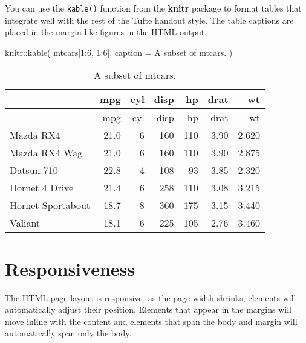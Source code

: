 \documentclass[
  letterpaper,
  DIV=11,
  numbers=noendperiod,
  oneside]{scrartcl}
\newenvironment{Shaded}{\begin{snugshade}}{\end{snugshade}}
\newcommand{\AttributeTok}[1]{\textcolor[rgb]{0.40,0.45,0.13}{#1}}
\newcommand{\DecValTok}[1]{\textcolor[rgb]{0.68,0.00,0.00}{#1}}
\newcommand{\FunctionTok}[1]{\textcolor[rgb]{0.28,0.35,0.67}{#1}}
\newcommand{\NormalTok}[1]{\textcolor[rgb]{0.00,0.23,0.31}{#1}}
\newcommand{\SpecialCharTok}[1]{\textcolor[rgb]{0.37,0.37,0.37}{#1}}
\newcommand{\StringTok}[1]{\textcolor[rgb]{0.13,0.47,0.30}{#1}}
\begin{document}
You can use the \texttt{kable()} function from the \textbf{knitr}
package to format tables that integrate well with the rest of the Tufte
handout style. The table captions are placed in the margin like figures
in the HTML output.

\begin{Shaded}
\begin{Highlighting}[]
\NormalTok{knitr}\SpecialCharTok{::}\FunctionTok{kable}\NormalTok{(}
\NormalTok{  mtcars[}\DecValTok{1}\SpecialCharTok{:}\DecValTok{6}\NormalTok{, }\DecValTok{1}\SpecialCharTok{:}\DecValTok{6}\NormalTok{], }\AttributeTok{caption =} \StringTok{\textquotesingle{}A subset of mtcars.\textquotesingle{}}
\NormalTok{)}
\end{Highlighting}
\end{Shaded}

{
\makeatletter
\def\LT@makecaption#1#2#3{%
  \noalign{\smash{\hbox{\kern\textwidth\rlap{\kern\marginparsep
  \parbox[t]{\marginparwidth}{%
    \footnotesize{%
      \vspace{(1.1\baselineskip)}
    #1{#2: }\ignorespaces #3}}}}}}%
    }
\makeatother

\begin{longtable}[]{@{}lrrrrrr@{}}
\caption{A subset of mtcars.}\tabularnewline
\toprule\noalign{}
& mpg & cyl & disp & hp & drat & wt \\
\midrule\noalign{}
\endfirsthead
\toprule\noalign{}
& mpg & cyl & disp & hp & drat & wt \\
\midrule\noalign{}
\endhead
\bottomrule\noalign{}
\endlastfoot
Mazda RX4 & 21.0 & 6 & 160 & 110 & 3.90 & 2.620 \\
Mazda RX4 Wag & 21.0 & 6 & 160 & 110 & 3.90 & 2.875 \\
Datsun 710 & 22.8 & 4 & 108 & 93 & 3.85 & 2.320 \\
Hornet 4 Drive & 21.4 & 6 & 258 & 110 & 3.08 & 3.215 \\
Hornet Sportabout & 18.7 & 8 & 360 & 175 & 3.15 & 3.440 \\
Valiant & 18.1 & 6 & 225 & 105 & 2.76 & 3.460 \\
\end{longtable}

}

\section{Responsiveness}\label{responsiveness}

The HTML page layout is responsive- as the page width shrinks, elements
will automatically adjust their position. Elements that appear in the
margins will move inline with the content and elements that span the
body and margin will automatically span only the body.
\end{document}
